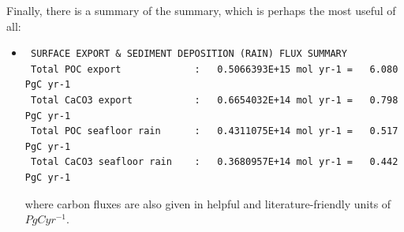 \begin{itemize}[noitemsep]
\vspace{1mm}
Finally, there is a summary of the summary, which is perhaps the most useful of all:
\vspace{1mm}
\begin{itemize}[noitemsep]
\item
\vspace{-0mm}\footnotesize\begin{verbatim}
 SURFACE EXPORT & SEDIMENT DEPOSITION (RAIN) FLUX SUMMARY
 Total POC export             :   0.5066393E+15 mol yr-1 =   6.080 PgC yr-1
 Total CaCO3 export           :   0.6654032E+14 mol yr-1 =   0.798 PgC yr-1
 Total POC seafloor rain      :   0.4311075E+14 mol yr-1 =   0.517 PgC yr-1
 Total CaCO3 seafloor rain    :   0.3680957E+14 mol yr-1 =   0.442 PgC yr-1
\end{verbatim}\normalsize\vspace{0mm}
where carbon fluxes are also given in helpful and literature-friendly units of \(PgCyr^{-1}\).
\end{itemize}


\end{itemize}
